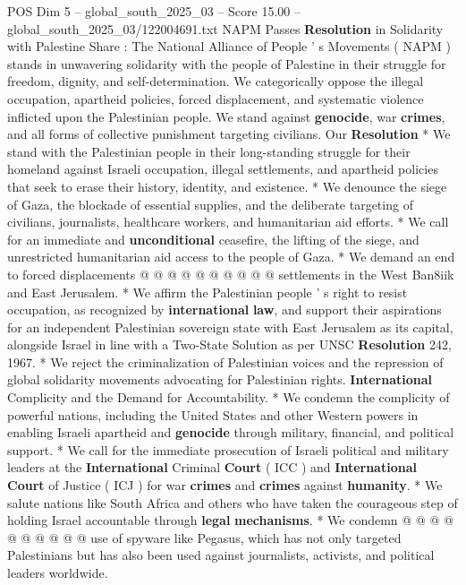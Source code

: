 \begin{textsample}{POS Dim 5 – global\_south\_2025\_03 – Score 15.00 – global\_south\_2025\_03/122004691.txt}  \label{ex:f5_pos_182}
NAPM Passes \textbf{Resolution} in Solidarity with Palestine Share : The National Alliance of People ' s Movements ( NAPM ) stands in unwavering solidarity with the people of Palestine in their struggle for freedom, dignity, and self-determination.
We categorically oppose the illegal occupation, apartheid policies, forced displacement, and systematic violence inflicted upon the Palestinian people.
We stand against \textbf{genocide}, war \textbf{crimes}, and all forms of collective punishment targeting civilians.
Our \textbf{Resolution} * We stand with the Palestinian people in their long-standing struggle for their homeland against Israeli occupation, illegal settlements, and apartheid policies that seek to erase their history, identity, and existence. * We denounce the siege of Gaza, the blockade of essential supplies, and the deliberate targeting of civilians, journalists, healthcare workers, and humanitarian aid efforts. * We call for an immediate and \textbf{unconditional} ceasefire, the lifting of the siege, and unrestricted humanitarian aid access to the people of Gaza. * We demand an end to forced displacements @ @ @ @ @ @ @ @ @ @ settlements in the West Ban8iik and East Jerusalem. * We affirm the Palestinian people ' s right to resist occupation, as recognized by \textbf{international} \textbf{law}, and support their aspirations for an independent Palestinian sovereign state with East Jerusalem as its capital, alongside Israel in line with a Two-State Solution as per UNSC \textbf{Resolution} 242, 1967. * We reject the criminalization of Palestinian voices and the repression of global solidarity movements advocating for Palestinian rights. \textbf{International} Complicity and the Demand for Accountability. * We condemn the complicity of powerful nations, including the United States and other Western powers in enabling Israeli apartheid and \textbf{genocide} through military, financial, and political support. * We call for the immediate prosecution of Israeli political and military leaders at the \textbf{International} Criminal \textbf{Court} ( ICC ) and \textbf{International} \textbf{Court} of Justice ( ICJ ) for war \textbf{crimes} and \textbf{crimes} against \textbf{humanity}. * We salute nations like South Africa and others who have taken the courageous step of holding Israel accountable through \textbf{legal} \textbf{mechanisms}. * We condemn @ @ @ @ @ @ @ @ @ @ use of spyware like Pegasus, which has not only targeted Palestinians but has also been used against journalists, activists, and political leaders worldwide.

\end{textsample}
